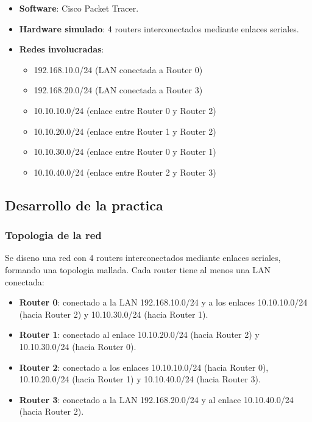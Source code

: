 \begin{itemize}
    \item \textbf{Software}: Cisco Packet Tracer.
    \item \textbf{Hardware simulado}: 4 routers interconectados mediante enlaces seriales.
    \item \textbf{Redes involucradas}:
    \begin{itemize}
        \item 192.168.10.0/24 (LAN conectada a Router 0)
        \item 192.168.20.0/24 (LAN conectada a Router 3)
        \item 10.10.10.0/24 (enlace entre Router 0 y Router 2)
        \item 10.10.20.0/24 (enlace entre Router 1 y Router 2)
        \item 10.10.30.0/24 (enlace entre Router 0 y Router 1)
        \item 10.10.40.0/24 (enlace entre Router 2 y Router 3)
    \end{itemize}
\end{itemize}

\subsection{Desarrollo de la practica}

\subsubsection{Topologia de la red}

Se diseno una red con 4 routers interconectados mediante enlaces seriales,
formando una topologia mallada. Cada router tiene al menos una LAN conectada:

\begin{itemize}
    \item \textbf{Router 0}: conectado a la LAN 192.168.10.0/24 y a los enlaces
    10.10.10.0/24 (hacia Router 2) y 10.10.30.0/24 (hacia Router 1).
    \item \textbf{Router 1}: conectado al enlace 10.10.20.0/24 (hacia Router 2) y
    10.10.30.0/24 (hacia Router 0).
    \item \textbf{Router 2}: conectado a los enlaces 10.10.10.0/24 (hacia Router 0),
    10.10.20.0/24 (hacia Router 1) y 10.10.40.0/24 (hacia Router 3).
    \item \textbf{Router 3}: conectado a la LAN 192.168.20.0/24 y al enlace
    10.10.40.0/24 (hacia Router 2).
\end{itemize}

